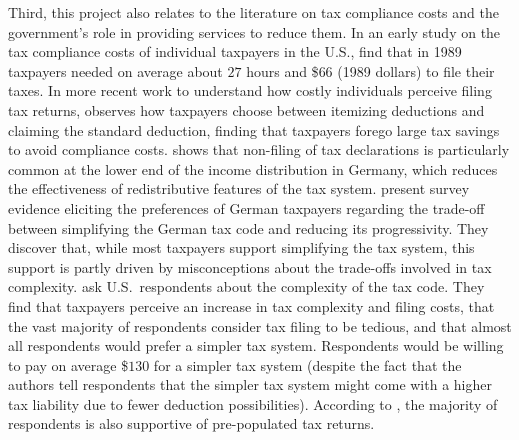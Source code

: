 \documentclass[12pt]{article}
\begin{document}
Third, this project also relates to the literature on tax compliance costs and the government's role in providing services to reduce them. In an early study on the tax compliance costs of individual taxpayers in the U.S., \textcite{blumenthal1992compliance} find that in 1989 taxpayers needed on average about $27$ hours and \$$66$ (1989 dollars) to file their taxes. In more recent work to understand how costly individuals perceive filing tax returns, \textcite{benzarti2020taxing} observes how taxpayers choose between itemizing deductions and claiming the standard deduction, finding that taxpayers forego large tax savings to avoid compliance costs. \textcite{hauck2024optional} shows that non-filing of tax declarations is particularly common at the lower end of the income distribution in Germany, which reduces the effectiveness of redistributive features of the tax system. \textcite{blesse2019people} present survey evidence eliciting the preferences of German taxpayers regarding the trade-off between simplifying the German tax code and reducing its progressivity. They discover that, while most taxpayers support simplifying the tax system, this support is partly driven by misconceptions about the trade-offs involved in tax complexity. \textcite{benzarti2024rising} ask U.S.\ respondents about the complexity of the tax code. They find that taxpayers perceive an increase in tax complexity and filing costs, that the vast majority of respondents consider tax filing to be tedious, and that almost all respondents would prefer a simpler tax system. Respondents would be willing to pay on average \$$130$ for a simpler tax system (despite the fact that the authors tell respondents that the simpler tax system might come with a higher tax liability due to fewer deduction possibilities). According to \textcite{benzarti2024rising}, the majority of respondents is also supportive of pre-populated tax returns.



\printbibliography
\end{document}
